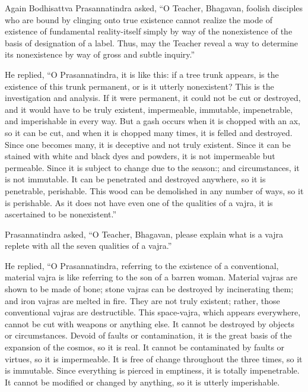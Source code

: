 \documentclass[a4paper,11pt,twoside,final]{book}
\begin{document}
Again Bodhisattva Prasannatindra asked, ``O Teacher, Bhagavan, foolish
disciples who are bound by clinging onto true existence cannot realize
the mode of existence of fundamental reality-itself simply by way of
the nonexistence of the basis of designation of a label. Thus, may the
Teacher reveal a way to determine its nonexistence by way of gross and
subtle inquiry.''

He replied, ``O Prasannatindra, it is like this: if a tree trunk
appears, is the existence of this trunk permanent, or is it utterly
nonexistent? This is the investigation and analysis. If it were
permanent, it could not be cut or destroyed, and it would have to be
truly existent, impermeable, immutable, impenetrable, and imperishable
in every way. But a gash occurs when it is chopped with an ax, so it
can be cut, and when it is chopped many times, it is felled and
destroyed. Since one becomes many, it is deceptive and not truly
existent. Since it can be stained with white and black dyes and
powders, it is not impermeable but permeable. Since it is subject to
change due to the season:; and circumstances, it is not immutable. It
can be penetrated and destroyed anywhere, so it is penetrable,
perishable. This wood can be demolished in any number of ways, so it
is perishable. As it does not have even one of the qualities of a
vajra, it is ascertained to be nonexistent.''

Prasannatindra asked, ``O Teacher, Bhagavan, please explain what is a
vajra replete with all the seven qualities of a vajra.''

He replied, ``O Prasannatindra, referring to the existence of a
conventional, material vajra is like referring to the son of a barren
woman. Material vajras are shown to be made of bone; stone vajras can
be destroyed by incinerating them; and iron vajras are melted in
fire. They are not truly existent; rather, those conventional vajras
are destructible. This space-vajra, which appears everywhere, cannot
be cut with weapons or anything else. It cannot be destroyed by
objects or circumstances. Devoid of faults or contamination, it is the
great basis of the expansion of the cosmos, so it is real. It cannot
be contaminated by faults or virtues, so it is impermeable. It is free
of change throughout the three times, so it is immutable. Since
everything is pierced in emptiness, it is totally impenetrable. It
cannot be modified or changed by anything, so it is utterly
imperishable.
\end{document}
